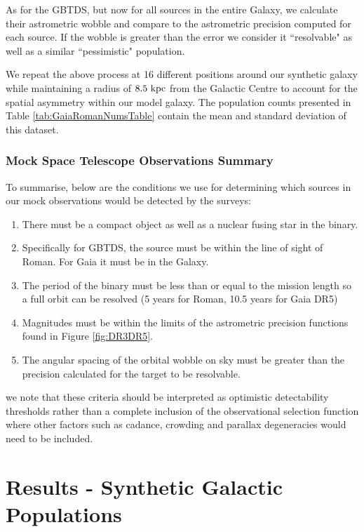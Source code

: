 \documentclass{pas}
\begin{document}
As for the GBTDS, but now for all sources in the entire Galaxy, we calculate their astrometric wobble and compare to the astrometric precision computed for each source. If the wobble is greater than the error we consider it ``resolvable" as well as a similar ``pessimistic" population. 

We repeat the above process at 16 different positions around our synthetic galaxy while maintaining a radius of $8.5~\rm{kpc}$ from the Galactic Centre to account for the spatial asymmetry within our model galaxy. The population counts presented in Table \ref{tab:GaiaRomanNumsTable} contain the mean and standard deviation of this dataset. 

\subsubsection{Mock Space Telescope Observations Summary}

To summarise, below are the conditions we use for determining which sources in our mock observations would be detected by the surveys:
\begin{enumerate}
    \item There must be a compact object as well as a nuclear fusing star in the binary.
    \item Specifically for GBTDS, the source must be within the line of sight of Roman. For Gaia it must be in the Galaxy.
    \item The period of the binary must be less than or equal to the mission length so a full orbit can be resolved (5 years for Roman, 10.5 years for Gaia DR5)
    \item Magnitudes must be within the limits of the astrometric precision functions found in Figure \ref{fig:DR3DR5}.
    \item The angular spacing of the orbital wobble on sky must be greater than the precision calculated for the target to be resolvable.

\end{enumerate}

we note that these criteria should be interpreted as optimistic detectability thresholds rather than a complete inclusion of the observational selection function where other factors such as cadance, crowding and parallax degeneracies would need to be included. 

\section{Results - Synthetic Galactic Populations}\label{results}
\end{document}
